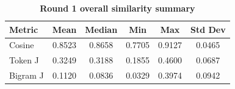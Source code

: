 \begin{table}[htbp]
\centering
\caption{\textbf{Round 1 overall similarity summary}}
\label{tab:round1-similarity-summary}
\renewcommand{\arraystretch}{1.4}
\begin{tabular}{|l|c|c|c|c|c|}
\hline
\textbf{Metric} & \textbf{Mean} & \textbf{Median} & \textbf{Min} & \textbf{Max} & \textbf{Std Dev} \\
\hline
Cosine & 0.8523 & 0.8658 & 0.7705 & 0.9127 & 0.0465 \\
\hline
Token J & 0.3249 & 0.3188 & 0.1855 & 0.4600 & 0.0687 \\
\hline
Bigram J & 0.1120 & 0.0836 & 0.0329 & 0.3974 & 0.0942 \\
\hline
\end{tabular}
\end{table}
